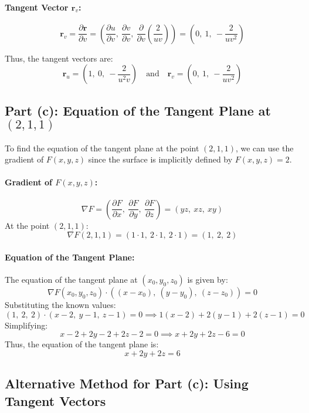 \documentclass[11pt]{article}
\begin{document}
\paragraph{Tangent Vector \( \mathbf{r}_v \):}
\[
\mathbf{r}_v = \frac{\partial \mathbf{r}}{\partial v} = \left( \frac{\partial u}{\partial v},\ \frac{\partial v}{\partial v},\ \frac{\partial}{\partial v} \left( \frac{2}{uv} \right ) \right ) = \left( 0,\ 1,\ -\frac{2}{u v^2} \right )
\]

Thus, the tangent vectors are:
\[
\boxed{ \mathbf{r}_u = \left( 1,\ 0,\ -\frac{2}{u^2 v} \right ) \quad \text{and} \quad \mathbf{r}_v = \left( 0,\ 1,\ -\frac{2}{u v^2} \right ) }
\]

\newpage

\subsection{Part (c): Equation of the Tangent Plane at \( (2, 1, 1) \)}

To find the equation of the tangent plane at the point \( (2, 1, 1) \), we can use the gradient of \( F(x,y,z) \) since the surface is implicitly defined by \( F(x,y,z) = 2 \).

\paragraph{Gradient of \( F(x,y,z) \):}
\[
\nabla F = \left( \frac{\partial F}{\partial x},\ \frac{\partial F}{\partial y},\ \frac{\partial F}{\partial z} \right ) = (yz,\ xz,\ xy)
\]
At the point \( (2, 1, 1) \):
\[
\nabla F(2,1,1) = (1 \cdot 1,\ 2 \cdot 1,\ 2 \cdot 1) = (1,\ 2,\ 2)
\]
\paragraph{Equation of the Tangent Plane:}

The equation of the tangent plane at \( (x_0, y_0, z_0) \) is given by:
\[
\nabla F(x_0, y_0, z_0) \cdot \left( (x - x_0),\ (y - y_0),\ (z - z_0) \right ) = 0
\]
Substituting the known values:
\[
(1,\ 2,\ 2) \cdot (x - 2,\ y - 1,\ z - 1) = 0 \implies 1(x - 2) + 2(y - 1) + 2(z - 1) = 0
\]
Simplifying:
\[
x - 2 + 2y - 2 + 2z - 2 = 0 \implies x + 2y + 2z - 6 = 0
\]
Thus, the equation of the tangent plane is:
\[
\boxed{ x + 2y + 2z = 6 }
\]

\newpage

\subsection{Alternative Method for Part (c): Using Tangent Vectors}
\end{document}
